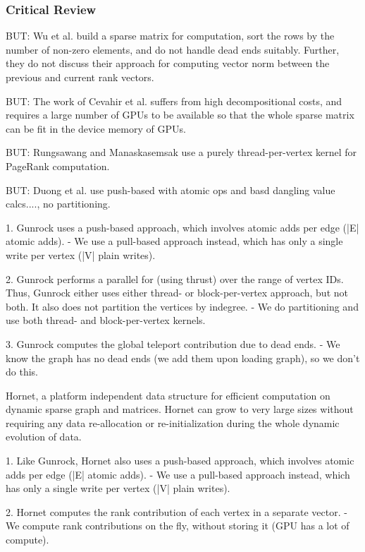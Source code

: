 \subsubsection{Critical Review}

BUT: Wu et al. \cite{rank-wu10} build a sparse matrix for computation, sort the rows by the number of non-zero elements, and do not handle dead ends suitably. Further, they do not discuss their approach for computing vector norm between the previous and current rank vectors.

BUT: The work of Cevahir et al. \cite{cevahir2010efficient} suffers from high decompositional costs, and requires a large number of GPUs to be available so that the whole sparse matrix can be fit in the device memory of GPUs.

BUT: Rungsawang and Manaskasemsak \cite{rank-rungsawang12} use a purely thread-per-vertex kernel for PageRank computation.

BUT: Duong et al. \cite{rank-duong12} use push-based with atomic ops and basd dangling value calcs...., no partitioning.

1. Gunrock uses a push-based approach, which involves atomic adds per edge (|E| atomic adds).
- We use a pull-based approach instead, which has only a single write per vertex (|V| plain writes).

2. Gunrock performs a parallel for (using thrust) over the range of vertex IDs.
Thus, Gunrock either uses either thread- or block-per-vertex approach, but not both.
It also does not partition the vertices by indegree.
- We do partitioning and use both thread- and block-per-vertex kernels.

3. Gunrock computes the global teleport contribution due to dead ends.
- We know the graph has no dead ends (we add them upon loading graph), so we don't do this.



Hornet, a platform independent data structure for efficient computation on dynamic sparse graph and matrices. Hornet can grow to very large sizes without requiring any data re-allocation or re-initialization during the whole dynamic evolution of data.

1. Like Gunrock, Hornet also uses a push-based approach, which involves atomic adds per edge (|E| atomic adds).
- We use a pull-based approach instead, which has only a single write per vertex (|V| plain writes).

2. Hornet computes the rank contribution of each vertex in a separate vector.
- We compute rank contributions on the fly, without storing it (GPU has a lot of compute).

